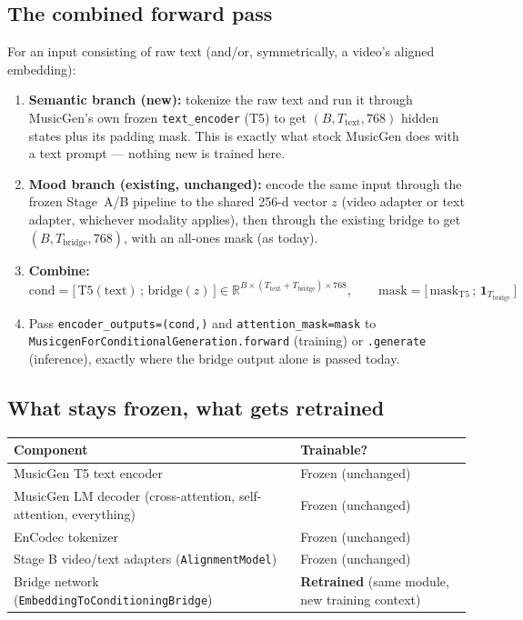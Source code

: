 \documentclass[11pt]{article}
\begin{document}
\subsection{The combined forward pass}
For an input consisting of raw text (and/or, symmetrically, a video's aligned embedding):
\begin{enumerate}
\item \textbf{Semantic branch (new):} tokenize the raw text and run it through MusicGen's own
frozen \texttt{text\_encoder} (T5) to get $(B, T_{\text{text}}, 768)$ hidden states plus its
padding mask. This is exactly what stock MusicGen does with a text prompt --- nothing new is
trained here.
\item \textbf{Mood branch (existing, unchanged):} encode the same input through the frozen
Stage~A/B pipeline to the shared 256-d vector $z$ (video adapter or text adapter, whichever
modality applies), then through the existing bridge to get $(B, T_{\text{bridge}}, 768)$, with an
all-ones mask (as today).
\item \textbf{Combine:}
\[
\text{cond} = \big[\, \text{T5}(\text{text}) \,;\, \text{bridge}(z) \,\big] \in
\mathbb{R}^{B \times (T_{\text{text}} + T_{\text{bridge}}) \times 768}, \qquad
\text{mask} = \big[\, \text{mask}_{\text{T5}} \,;\, \mathbf{1}_{T_{\text{bridge}}} \,\big]
\]
\item Pass \texttt{encoder\_outputs=(cond,)} and \texttt{attention\_mask=mask} to
\texttt{MusicgenForConditionalGeneration.forward} (training) or \texttt{.generate} (inference),
exactly where the bridge output alone is passed today.
\end{enumerate}

\subsection{What stays frozen, what gets retrained}
\begin{center}
\begin{tabularx}{\textwidth}{@{}X l@{}}
\toprule
\textbf{Component} & \textbf{Trainable?} \\
\midrule
MusicGen T5 text encoder & Frozen (unchanged) \\
MusicGen LM decoder (cross-attention, self-attention, everything) & Frozen (unchanged) \\
EnCodec tokenizer & Frozen (unchanged) \\
Stage B video/text adapters (\texttt{AlignmentModel}) & Frozen (unchanged) \\
Bridge network (\texttt{EmbeddingToConditioningBridge}) & \textbf{Retrained} (same module, new training context) \\
\bottomrule
\end{tabularx}
\end{center}
\end{document}
